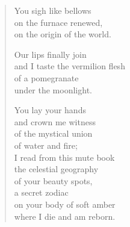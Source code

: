 \documentclass[twocolumn,11pt]{article}
\begin{document}
\begin{verse}
  You sigh like bellows \\
  on the furnace renewed, \\
  on the origin of the world.

  Our lips finally join \\
  and I taste the vermilion flesh\\
  of a pomegranate \\
  under the moonlight.

  You lay your hands \\
  and crown me witness \\
  of the mystical union \\
  of water and fire; \\
  I read from this mute book \\
  the celestial geography \\
  of your beauty spots, \\
  a secret zodiac \\
  on your body of soft amber \\
  where I die and am reborn.
\end{verse}
\end{document}
